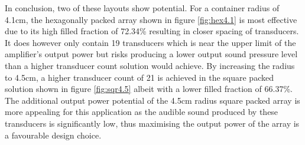 In conclusion, two of these layouts show potential. For a container radius of 4.1cm, the hexagonally packed array shown in figure \ref{fig:hex4.1} is most effective due to its high filled fraction of 72.34\% resulting in closer spacing of transducers. It does however only contain 19 transducers which is near the upper limit of the amplifier's output power but risks producing a lower output sound pressure level than a higher transducer count solution would achieve. By increasing the radius to 4.5cm, a higher transducer count of 21 is achieved in the square packed solution shown in figure \ref{fig:sqr4.5} albeit with a lower filled fraction of 66.37\%. The additional output power potential of the 4.5cm radius square packed array is more appealing for this application as the audible sound produced by these transducers is significantly low, thus maximising the output power of the array is a favourable design choice.

